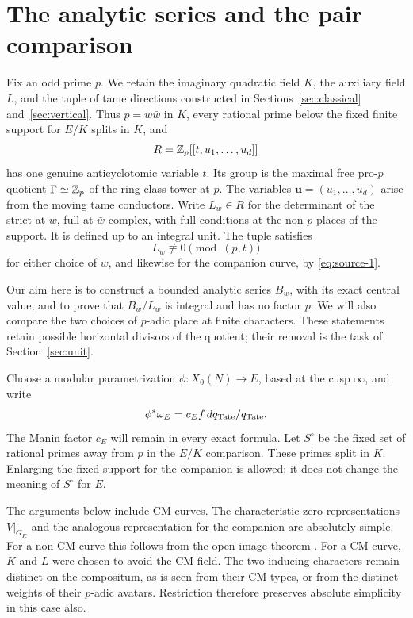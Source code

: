 \section{The analytic series and the pair comparison}\label{sec:pair}

Fix an odd prime \(p\).  We retain the imaginary quadratic field \(K\),
the auxiliary field \(L\), and the tuple of tame directions constructed
in Sections~\ref{sec:classical} and~\ref{sec:vertical}.  Thus \(p=w\bar w\)
in \(K\), every rational prime below the fixed finite support for
\(E/K\) splits in \(K\), and
\[
 R=\mathbb Z_p[[t,u_1,\ldots,u_d]]
\]
has one genuine anticyclotomic variable \(t\).  Its group is the maximal
free pro-\(p\) quotient \(\Gamma\simeq\mathbb Z_p\) of the ring-class tower at
\(p\).  The variables \(\mathbf u=(u_1,\ldots,u_d)\) arise from the
moving tame conductors.  Write \(L_w\in R\) for the determinant of the
strict-at-\(w\), full-at-\(\bar w\) complex, with full conditions at the
non-\(p\) places of the support.  It is defined up to an integral unit.
The tuple satisfies
\[
 L_w\not\equiv0\pmod{(p,t)}
\]
for either choice of \(w\), and likewise for the companion curve, by
\eqref{eq:source-1}.

Our aim here is to construct a bounded analytic series \(B_w\), with its
exact central value, and to prove that \(B_w/L_w\) is integral and has
no factor \(p\).  We will also compare the two choices of \(p\)-adic
place at finite characters.  These statements retain possible
horizontal divisors of the quotient; their removal is the task of
Section~\ref{sec:unit}.

Choose a modular parametrization \(\phi:X_0(N)\longrightarrow E\),
based at the cusp \(\infty\), and write
\[
 \phi^*\omega_E=c_E f\,dq_{\rm Tate}/q_{\rm Tate}.
\]
The Manin factor \(c_E\) will remain in every exact formula.  Let
\(S^\circ\) be the fixed set of rational primes away from \(p\) in the
\(E/K\) comparison.  These primes split in \(K\).  Enlarging the fixed
support for the companion is allowed; it does not change the meaning
of \(S^\circ\) for \(E\).

The arguments below include CM curves.  The characteristic-zero
representations \(V|_{G_K}\) and the analogous representation for the
companion are absolutely simple.  For a non-CM curve this follows from
the open image theorem \cite{Serre}.  For a CM curve, \(K\) and \(L\)
were chosen to avoid the CM field.  The two inducing characters remain
distinct on the compositum, as is seen from their CM types, or from
the distinct weights of their \(p\)-adic avatars.  Restriction therefore
preserves absolute simplicity in this case also.

